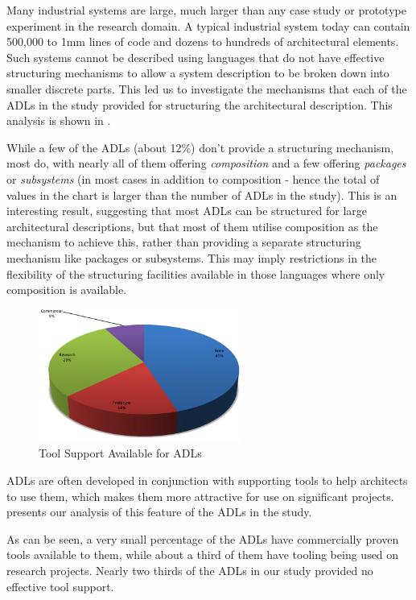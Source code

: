 Many industrial systems are large, much larger than any case study or prototype experiment in the research domain.  A typical industrial system today can contain 500,000 to 1mm lines of code and dozens to hundreds of architectural elements.  Such systems cannot be described using languages that do not have effective structuring mechanisms to allow a system description to be broken down into smaller discrete parts.  This led us to investigate the mechanisms that each of the ADLs in the study provided for structuring the architectural description.  This analysis is shown in .

While a few of the ADLs (about 12\%) don't provide a structuring mechanism, most do, with nearly all of them offering \emph{composition} and a few offering \emph{packages} or \emph{subsystems} (in most cases in addition to composition - hence the total of values in the chart is larger than the number of ADLs in the study).
This is an interesting result, suggesting that most ADLs can be structured for large architectural descriptions, but that most of them utilise composition as the mechanism to achieve this, rather than providing a separate structuring mechanism like packages or subsystems.  This may imply restrictions in the flexibility of the structuring facilities available in those languages where only composition is available.

\begin{figure}
\centering
\includegraphics[width=0.6\textwidth]{Figures/litreview-adl-toolsupport}
\caption{Tool Support Available for ADLs}
\label{figure:litreview-adl-toolsupport}
\end{figure}

ADLs are often developed in conjunction with supporting tools to help architects to use them, which makes them more attractive for use on significant projects.  presents our analysis of this feature of the ADLs in the study.

As can be seen, a very small percentage of the ADLs have commercially proven tools available to them, while about a third of them have tooling being used on research projects.  Nearly two thirds of the ADLs in our study provided no effective tool support.

